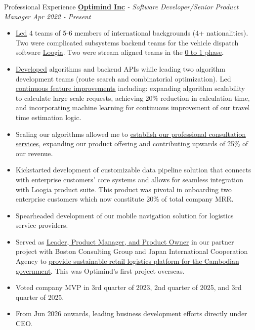 \documentclass{resume} %
\begin{document}

\begin{rSection}{Professional Experience}
{\bf \href{https://www.optimind.tech/}{Optimind Inc}} {\textit{- Software Developer/Senior Product Manager }} \hfill {\em Apr 2022 - Present} 
\begin{itemize}
\item \uline{Led} 4 teams of 5-6 members of international backgrounds (4+ nationalities). Two were complicated subsystems backend teams for the vehicle dispatch software \href{https://loogia.jp/}{Loogia}. Two were stream aligned teams in the \uline{0 to 1 phase}. 
\item \uline{Developed} algorithms and backend APIs while leading two algorithm development teams (route search and combinatorial optimization). Led \uline{continuous feature improvements} including: expanding algorithm scalability to calculate large scale requests, achieving 20\% reduction in calculation time, and incorporating machine learning for continuous improvement of our travel time estimation logic. 
\item Scaling our algorithms allowed me to \uline{establish our \href{https://loogia.jp/consulting/}{professional consultation services}}, expanding our product offering and contributing upwards of 25\% of our revenue. 
\item Kickstarted development of customizable data pipeline solution that connects with enterprise customers' core systems and allows for seamless integration with Loogia product suite. This product was pivotal in onboarding two enterprise customers which now constitute 20\% of total company MRR. 
\item Spearheaded development of our mobile navigation solution for logistics service providers. 
\item Served as \uline{Leader, Product Manager, and Product Owner} in our partner project with Boston Consulting Group and Japan International Cooperation Agency to \href{https://www.jica.go.jp/english/about/dx/project/detail/1569316_68029.html}{provide sustainable retail logistics platform for the Cambodian government}. This was Optimind's first project overseas. 
\item Voted company MVP in 3rd quarter of 2023, 2nd quarter of 2025, and 3rd quarter of 2025.  
\item From Jun 2026 onwards, leading business development efforts directly under CEO. 
\end{itemize}


\end{rSection}
\end{document}
